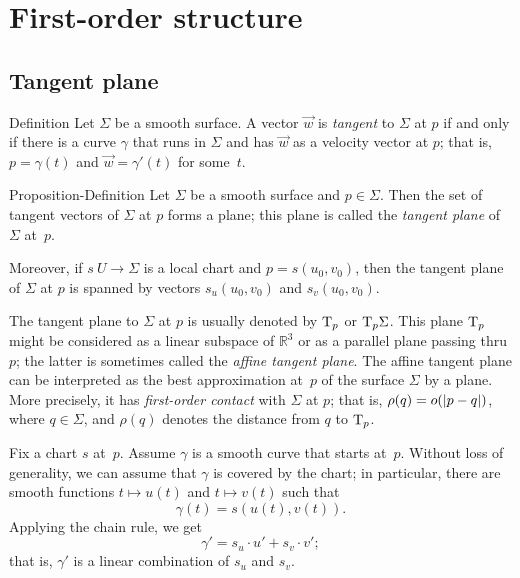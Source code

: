 \chapter{First-order structure}
\label{chap:first-order}
\section{Tangent plane}

\begin{thm}{Definition}\label{def:tangent-vector}
Let $\Sigma$ be a smooth surface.
A vector $\vec w$ is \emph{tangent} to $\Sigma$ at $p$ if and only if there is a curve $\gamma$ that runs in $\Sigma$ and has $\vec w$ as a velocity vector at $p$;
that is, $p=\gamma(t)$ and $\vec w=\gamma'(t)$ for some~$t$.
\end{thm}

\begin{thm}{Proposition-Definition}\label{def:tangent-plane}
Let $\Sigma$ be a smooth surface and $p\in \Sigma$.
Then the set of tangent vectors of $\Sigma$ at $p$ forms a plane;
this plane is called the \emph{tangent plane} of $\Sigma$ at~$p$.

Moreover, if $s\:U\to \Sigma$ is a local chart and $p=s(u_0,v_0)$, then 
the tangent plane of $\Sigma$ at $p$ is spanned by vectors $s_u(u_0,v_0)$ and $s_v(u_0,v_0)$.
\end{thm}

The tangent plane to $\Sigma$ at $p$ is usually denoted by $\mathrm{T}_p$ or $\mathrm{T}_p\Sigma$.
This plane $\mathrm{T}_p$ might be considered as a linear subspace of $\mathbb{R}^3$ or as a parallel plane passing thru $p$;
the latter is sometimes called the \emph{affine tangent plane}.
The affine tangent plane can be interpreted as the best approximation at~$p$ of the surface $\Sigma$ by a plane.
More precisely, 
it has \emph{first-order contact} with $\Sigma$ at $p$;
that is, $\rho(q)\z=o(|p-q|)$, where $q\in \Sigma$, and $\rho(q)$ denotes the distance from $q$ to $\mathrm{T}_p$.

Fix a chart $s$ at~$p$.
Assume $\gamma$ is a smooth curve that starts at~$p$.
Without loss of generality, we can assume that $\gamma$ is covered by the chart;
in particular, there are smooth functions $t\mapsto u(t)$ and $t\mapsto v(t)$ such that 
\[\gamma(t)=s(u(t),v(t)).\]
Applying the chain rule, we get
\[\gamma'=s_u\cdot u'+ s_v\cdot v';\]
that is, $\gamma'$ is a linear combination of $s_u$ and $s_v$.

